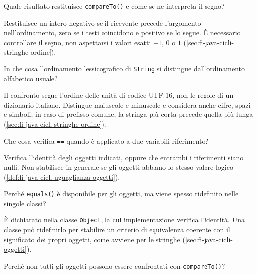 \begin{exercise}
\label{ex:fi-esercizi-java-cicli-compareto}
Quale risultato restituisce \texttt{compareTo()} e come se ne
interpreta il segno?
\end{exercise}

Restituisce un intero negativo se il ricevente precede l'argomento
nell'ordinamento, zero se i testi coincidono e positivo se lo segue.
È necessario controllare il segno, non aspettarsi i valori esatti
\(-1\), \(0\) o \(1\)
(\cref{sec:fi-java-cicli-stringhe-ordine}).

\begin{exercise}
\label{ex:fi-esercizi-java-cicli-lessicografico}
In che cosa l'ordinamento lessicografico di \texttt{String}
si distingue dall'ordinamento alfabetico usuale?
\end{exercise}

Il confronto segue l'ordine delle unità di codice UTF-16, non le
regole di un dizionario italiano. Distingue maiuscole e minuscole
e considera anche cifre, spazi e simboli; in caso di prefisso
comune, la stringa più corta precede quella più lunga
(\cref{sec:fi-java-cicli-stringhe-ordine}).

\begin{exercise}
\label{ex:fi-esercizi-java-cicli-oggetti-operatore}
Che cosa verifica \texttt{==} quando è applicato a due variabili
riferimento?
\end{exercise}

Verifica l'identità degli oggetti indicati, oppure che entrambi i
riferimenti siano nulli. Non stabilisce in generale se gli oggetti
abbiano lo stesso valore logico
(\cref{def:fi-java-cicli-uguaglianza-oggetti}).

\begin{exercise}
\label{ex:fi-esercizi-java-cicli-equals-object}
Perché \texttt{equals()} è disponibile per gli oggetti, ma
viene spesso ridefinito nelle singole classi?
\end{exercise}

È dichiarato nella classe \texttt{Object}, la cui implementazione
verifica l'identità. Una classe può ridefinirlo per stabilire
un criterio di equivalenza coerente con il significato dei propri
oggetti, come avviene per le stringhe
(\cref{sec:fi-java-cicli-oggetti}).

\begin{exercise}
\label{ex:fi-esercizi-java-cicli-comparable}
Perché non tutti gli oggetti possono essere confrontati con
\texttt{compareTo()}?
\end{exercise}


